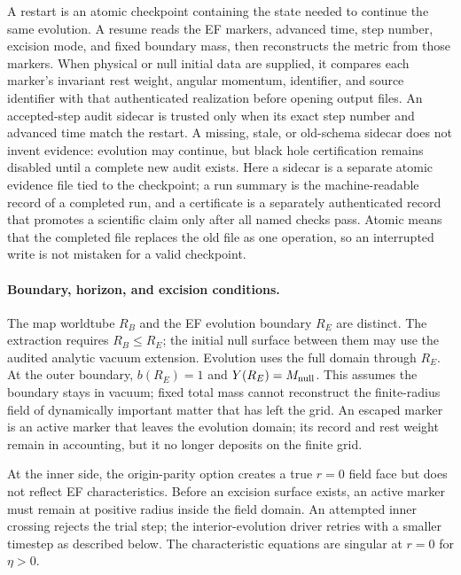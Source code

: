 A restart is an atomic checkpoint containing the state needed to continue the
same evolution.  A resume reads the EF markers, advanced time, step number,
excision mode, and fixed boundary mass, then reconstructs the metric from
those markers. When physical or null initial data are supplied, it compares
each marker's invariant rest weight, angular momentum, identifier, and source
identifier with that authenticated realization before opening output files.
An accepted-step audit sidecar is trusted only when its exact
step number and advanced time match the restart.  A missing, stale, or
old-schema sidecar does not invent evidence: evolution may continue, but
black hole certification remains disabled until a complete new audit exists.
Here a sidecar is a separate atomic evidence file tied to the checkpoint; a
run summary is the machine-readable record of a completed run, and a
certificate is a separately authenticated record that promotes a scientific
claim only after all named checks pass.
Atomic means that the completed file replaces the old file as one operation,
so an interrupted write is not mistaken for a valid checkpoint.

\paragraph{Boundary, horizon, and excision conditions.}
The map worldtube \(R_B\) and the EF evolution boundary \(R_E\) are distinct.
The extraction requires \(R_B\le R_E\); the initial null surface between them
may use the audited analytic vacuum extension.  Evolution uses the full
domain through \(R_E\).  At the outer boundary,
\(b(R_E)=1\) and \(Y(R_E)=M_{\rm null}\).  This assumes the boundary stays in
vacuum; fixed total mass cannot reconstruct the finite-radius field of
dynamically important matter that has left the grid.
An escaped marker is an active marker that leaves the evolution domain; its
record and rest weight remain in accounting, but it no longer deposits on the
finite grid.

At the inner side, the origin-parity option creates a true \(r=0\) field face
but does not reflect EF characteristics.  Before an excision surface exists,
an active marker must remain at positive radius inside the field domain.
An attempted inner crossing rejects the trial step; the interior-evolution driver
retries with a smaller timestep as described below.
The characteristic equations are singular at \(r=0\) for \(\eta>0\).


